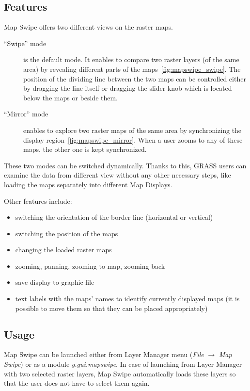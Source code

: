 \documentclass[a4paper,12pt,oneside]{book}
\newcommand{\module}[1]{\textsl{#1}}
\newcommand{\ms}{Map Swipe\xspace}
\begin{document}
\subsection{Features}
Map Swipe offers two different views on the raster maps.
\begin{description}
  \item[``Swipe'' mode] is the default mode. It enables to compare two raster layers (of the same area)
  by revealing different parts of the maps~\ref{fig:mapswipe_swipe}.
  The position of the dividing line between the two maps
  can be controlled either by dragging the line itself or dragging the slider knob which
  is located below the maps or beside them.

  \item[``Mirror'' mode] enables to explore two raster maps of the same area by
  synchronizing the display region~\ref{fig:mapswipe_mirror}. When a user zooms
  to any of these maps, the other one is kept synchronized.
\end{description}

These two modes can be switched dynamically. Thanks to this, GRASS users can
examine the data from different view without any other necessary steps, like loading
the maps separately into different Map Displays.

\noindent Other features include:
\begin{itemize}
    \item switching the orientation of the border line (horizontal or vertical)
    \item switching the position of the maps
    \item changing the loaded raster maps
    \item zooming, panning, zooming to map, zooming back
    \item save display to graphic file
    \item text labels with the maps' names to identify currently displayed maps
    (it is possible to move them so that they can be placed appropriately)
\end{itemize}

    
\subsection{Usage}
\ms can be launched either from Layer Manager menu (\emph{File} $\rightarrow$ \emph{Map Swipe}) or
as a module \module{g.gui.mapswipe}.
In case of launching from Layer Manager with two selected raster layers,
\ms automatically loads these layers so that the user does not have to select them again.
\end{document}

